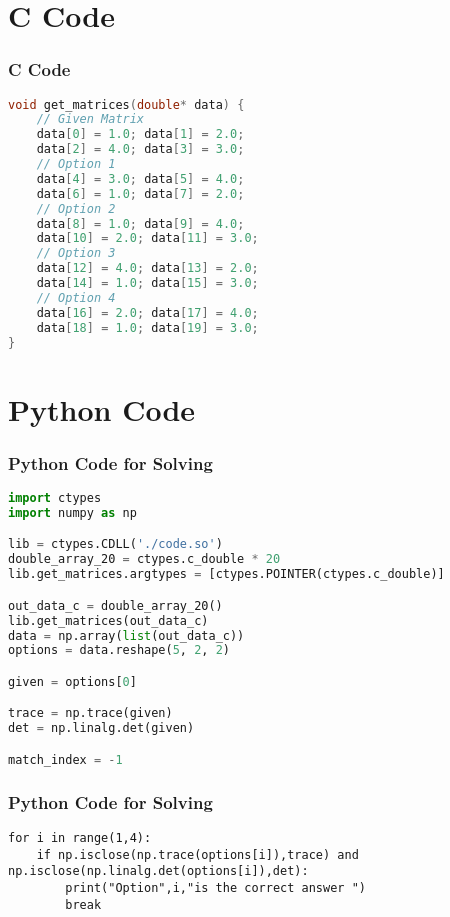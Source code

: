 \documentclass{beamer}
\theoremstyle{remark}
\numberwithin{equation}{section}
\begin{document}
\section{C Code}
\begin{frame}[fragile]
\frametitle{C Code}
\begin{lstlisting}[language=C]
void get_matrices(double* data) {
    // Given Matrix
    data[0] = 1.0; data[1] = 2.0;
    data[2] = 4.0; data[3] = 3.0;
    // Option 1
    data[4] = 3.0; data[5] = 4.0;
    data[6] = 1.0; data[7] = 2.0;
    // Option 2
    data[8] = 1.0; data[9] = 4.0;
    data[10] = 2.0; data[11] = 3.0;
    // Option 3
    data[12] = 4.0; data[13] = 2.0;
    data[14] = 1.0; data[15] = 3.0;
    // Option 4
    data[16] = 2.0; data[17] = 4.0;
    data[18] = 1.0; data[19] = 3.0;
}

\end{lstlisting}
\end{frame}

\section{Python Code}
\begin{frame}[fragile]
\frametitle{Python Code for Solving}
\begin{lstlisting}[language=Python]
import ctypes
import numpy as np

lib = ctypes.CDLL('./code.so')
double_array_20 = ctypes.c_double * 20
lib.get_matrices.argtypes = [ctypes.POINTER(ctypes.c_double)]

out_data_c = double_array_20()
lib.get_matrices(out_data_c)
data = np.array(list(out_data_c))
options = data.reshape(5, 2, 2)

given = options[0]

trace = np.trace(given)
det = np.linalg.det(given)

match_index = -1
\end{lstlisting}
\end{frame}
 \begin{frame}[fragile]
\frametitle{Python Code for Solving}
\begin{lstlisting}
for i in range(1,4):
    if np.isclose(np.trace(options[i]),trace) and np.isclose(np.linalg.det(options[i]),det):
        print("Option",i,"is the correct answer ")
        break
\end{lstlisting}
\end{frame}
\end{document}

